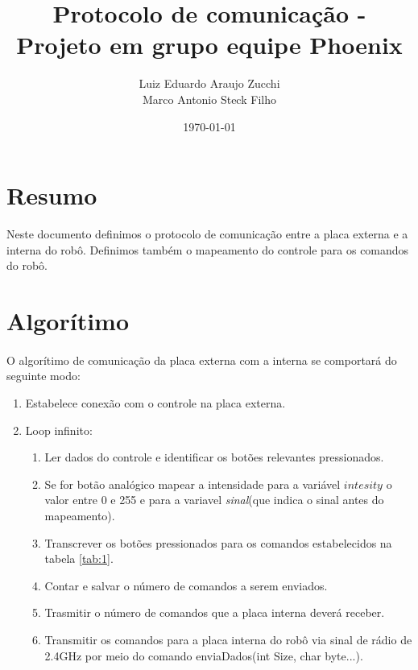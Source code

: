 \documentclass{article}
\title{Protocolo de comunicação - Projeto em grupo equipe Phoenix}
\author{
    Luiz Eduardo Araujo Zucchi\\
    Marco Antonio Steck Filho
}
\date{\today}
\begin{document}
    \maketitle
    \newpage

    \section{Resumo}
        Neste documento definimos o protocolo de comunicação entre a placa externa e a interna do robô. Definimos também o mapeamento do controle para os comandos do robô.

    \section{Algorítimo}
        \label{sec:1}
        \paragraph{}
        O algorítimo de comunicação da placa externa com a interna se comportará do seguinte modo:
        \begin{enumerate}
            \item Estabelece conexão com o controle na placa externa.
            \item Loop infinito:
            \begin{enumerate}
                \item Ler dados do controle e identificar os botões relevantes pressionados.
                \item Se for botão analógico mapear a intensidade para a variável $\textit{intesity}$ o valor entre 0 e 255 e para a variavel \textit{sinal}(que indica o sinal antes do mapeamento).
                \item Transcrever os botões pressionados para os comandos estabelecidos na tabela \ref{tab:1}.
                \item Contar e salvar o número de comandos a serem enviados.
                \item Trasmitir o número de comandos que a placa interna deverá receber.
                \item Transmitir os comandos para a placa interna do robô via sinal de rádio de 2.4GHz por meio do comando enviaDados(int Size, char byte...).
            \end{enumerate}
        \end{enumerate}
\end{document}
